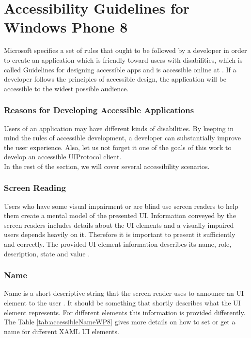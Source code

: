\section{Accessibility Guidelines for Windows Phone 8}
\label{sec:accGuidelines}
Microsoft specifies a set of rules that ought to be followed by a developer in order to create an application which is friendly toward users with disabilities, which is called Guidelines for designing accessible apps and is accessible online at \cite{wp8guide}. If a developer follows the principles of accessible design, the application will be accessible to the widest possible audience.

\subsubsection{Reasons for Developing Accessible Applications}
Users of an application may have different kinds of disabilities. By keeping in mind the rules of accessible development, a developer can substantially improve the user experience. Also, let us not forget it one of the goals of this work to develop an accessible UIProtocol client.
\\In the rest of the section, we will cover several accessibility scenarios.

\subsubsection{Screen Reading}
Users who have some visual impairment or are blind use screen readers to help them create a mental model of the presented UI. Information conveyed by the screen readers includes details about the UI elements and a visually impaired users depends heavily on it. Therefore it is important to present it sufficiently and correctly.
The provided UI element information describes its name, role, description, state and value \cite{wp8guide}.

\subsubsection{Name}
Name is a short descriptive string that the screen reader uses to announce an UI element to the user \cite{wp8guide}. It should be something that shortly describes what the UI element represents. For different elements this information is provided differently. The Table \ref{tab:accessibleNameWP8} gives more details on how to set or get a name for different XAML UI elements.


